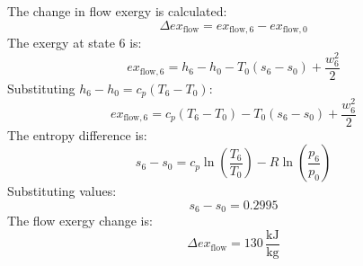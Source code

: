 The change in flow exergy is calculated:  
\[
\Delta ex_{\text{flow}} = ex_{\text{flow},6} - ex_{\text{flow},0}
\]  
The exergy at state 6 is:  
\[
ex_{\text{flow},6} = h_6 - h_0 - T_0 (s_6 - s_0) + \frac{w_6^2}{2}
\]  
Substituting \( h_6 - h_0 = c_p (T_6 - T_0) \):  
\[
ex_{\text{flow},6} = c_p (T_6 - T_0) - T_0 (s_6 - s_0) + \frac{w_6^2}{2}
\]  
The entropy difference is:  
\[
s_6 - s_0 = c_p \ln \left( \frac{T_6}{T_0} \right) - R \ln \left( \frac{p_6}{p_0} \right)
\]  
Substituting values:  
\[
s_6 - s_0 = 0.2995
\]  
The flow exergy change is:  
\[
\Delta ex_{\text{flow}} = 130 \, \frac{\text{kJ}}{\text{kg}}
\]